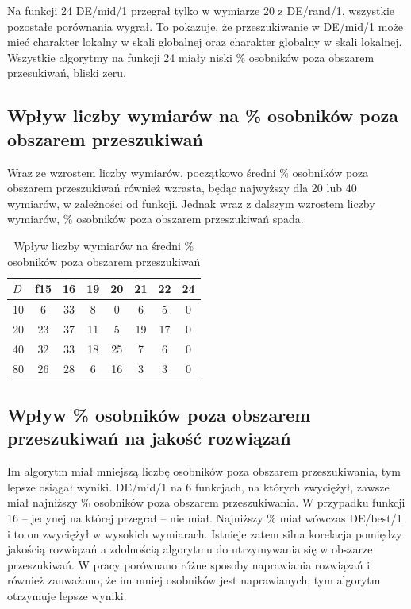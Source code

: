 \documentclass[a4paper,onecolumn,oneside,11pt,wide,floatssmall]{mwrep}
\theoremstyle{definition}
\theoremstyle{plain}%
\theoremstyle{remark}
\begin{document}
Na funkcji 24 DE/mid/1 przegrał tylko w wymiarze 20 z DE/rand/1, wszystkie pozostałe porównania 
wygrał. To pokazuje, że przeszukiwanie w DE/mid/1 może mieć charakter lokalny w skali globalnej 
oraz charakter globalny w skali lokalnej. Wszystkie algorytmy na funkcji 24 miały niski
\% osobników poza obszarem przesukiwań, bliski zeru. 

\subsection{Wpływ liczby wymiarów na \% osobników poza obszarem przeszukiwań}

Wraz ze wzrostem liczby wymiarów, początkowo średni \% osobników poza obszarem przeszukiwań również 
wzrasta, będąc najwyższy dla 20 lub 40 wymiarów, w zależności od funkcji. Jednak wraz z dalszym
wzrostem liczby wymiarów, \% osobników poza obszarem przeszukiwań spada. 

\begin{table}[H]
\centering
\begin{tabular}{ l | c | c | c | c | c | c | c }
$D$ &f15& 16& 19& 20& 21& 22& 24 \\ \hline
10              & 6 & 33 &  8 &  0 & 6 & 5 & 0 \\
20              & 23 & 37 & 11&  5 & 19 & 17 & 0 \\
40		& 32 & 33 & 18 & 25 & 7 & 6 & 0 \\
80		& 26 & 28 & 6 & 16 & 3 & 3 & 0 \\
\end{tabular}
\caption{Wpływ liczby wymiarów na średni \% osobników poza obszarem przeszukiwań}
\end{table}

\subsection{Wpływ \% osobników poza obszarem przeszukiwań na jakość rozwiązań}

Im algorytm miał mniejszą liczbę osobników poza obszarem przeszukiwania, tym lepsze osiągał wyniki.
DE/mid/1 na 6 funkcjach, na których zwyciężył, zawsze miał najniższy \% osobników poza obszarem
przeszukiwania. W przypadku funkcji 16 -- jedynej na której przegrał -- nie miał. Najniższy \% miał 
wówczas DE/best/1 i to on zwyciężył w wysokich wymiarach. Istnieje zatem silna korelacja
pomiędzy jakością rozwiązań a zdolnością algorytmu do utrzymywania się w obszarze przeszukiwań.
W pracy \cite{boundary} porównano różne sposoby naprawiania rozwiązań i również zauważono, że im mniej
osobników jest naprawianych, tym algorytm otrzymuje lepsze wyniki.
\end{document}
